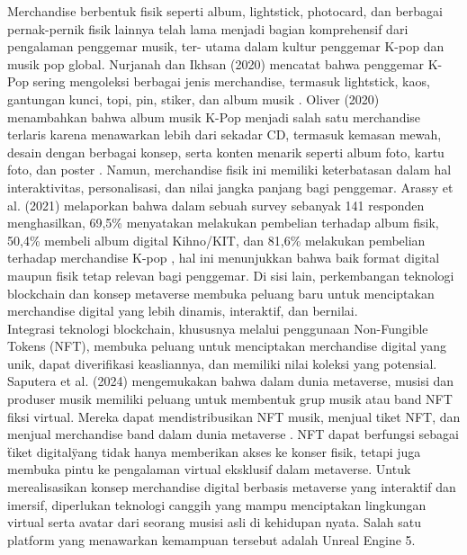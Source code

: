 Merchandise berbentuk fisik seperti album, lightstick, photocard, dan berbagai pernak-pernik fisik lainnya telah lama menjadi bagian
komprehensif dari pengalaman penggemar musik, ter- utama dalam kultur penggemar K-pop dan musik pop global. Nurjanah dan
Ikhsan (2020) mencatat bahwa penggemar K-Pop sering mengoleksi berbagai jenis merchandise, termasuk lightstick, kaos,
gantungan kunci, topi, pin, stiker, dan album musik \parencite{Nurjanah2020}. Oliver (2020) menambahkan bahwa album musik K-Pop menjadi 
salah satu merchandise terlaris karena menawarkan lebih dari sekadar CD, termasuk kemasan mewah, desain dengan berbagai
konsep, serta konten menarik seperti album foto, kartu foto, dan poster \parencite{Oliver2020}. Namun, merchandise fisik ini memiliki 
keterbatasan dalam hal interaktivitas, personalisasi, dan nilai jangka panjang bagi penggemar. Arassy et al. (2021)
melaporkan bahwa dalam sebuah survey sebanyak 141 responden menghasilkan, 69,5\% menyatakan melakukan pembelian terhadap
album fisik, 50,4\% membeli album digital Kihno/KIT, dan 81,6\% melakukan pembelian terhadap merchandise K-pop \parencite{Saputera2024},
hal ini menunjukkan bahwa baik format digital maupun fisik tetap relevan bagi penggemar. Di sisi lain, perkembangan teknologi
blockchain dan konsep metaverse membuka peluang baru untuk menciptakan merchandise digital yang lebih dinamis, interaktif, dan
bernilai.
\\

Integrasi teknologi blockchain, khususnya melalui penggunaan Non-Fungible Tokens (NFT), membuka peluang untuk menciptakan 
merchandise digital yang unik, dapat diverifikasi keasliannya, dan memiliki nilai koleksi yang potensial. Saputera et al. 
(2024) mengemukakan bahwa dalam dunia metaverse, musisi dan produser musik memiliki peluang untuk membentuk grup musik atau
band NFT fiksi virtual. Mereka dapat mendistribusikan NFT musik, menjual tiket NFT, dan menjual merchandise band dalam 
dunia metaverse \parencite{Saputera2024}. NFT dapat berfungsi sebagai \"tiket digital\" yang tidak hanya memberikan akses ke konser fisik, 
tetapi juga membuka pintu ke pengalaman virtual eksklusif dalam metaverse. Untuk merealisasikan konsep merchandise digital
berbasis metaverse yang interaktif dan imersif, diperlukan teknologi canggih yang mampu menciptakan lingkungan virtual 
serta avatar dari seorang musisi asli di kehidupan nyata. Salah satu platform yang menawarkan kemampuan tersebut adalah 
Unreal Engine 5.
\\

